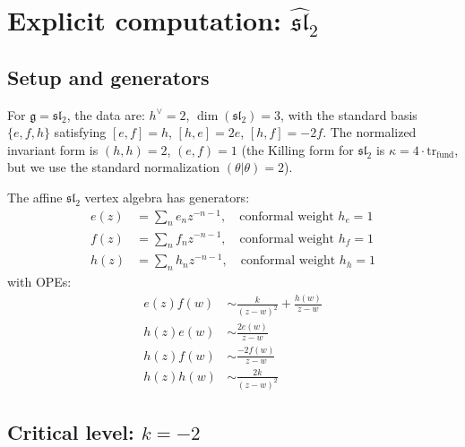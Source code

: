 \section{\texorpdfstring{Explicit computation: $\widehat{\mathfrak{sl}}_2$}{Explicit computation: sl-2}}

\subsection{Setup and generators}

For $\mathfrak{g} = \mathfrak{sl}_2$, the data are: $h^\vee = 2$, $\dim(\mathfrak{sl}_2) = 3$, with the standard basis $\{e, f, h\}$ satisfying $[e,f] = h$, $[h,e] = 2e$, $[h,f] = -2f$.  The normalized invariant form is $(h,h) = 2$, $(e,f) = 1$ (the Killing form for $\mathfrak{sl}_2$ is $\kappa = 4 \cdot \text{tr}_{\text{fund}}$, but we use the standard normalization $(\theta|\theta) = 2$).

\begin{definition}
The affine $\mathfrak{sl}_2$ vertex algebra has generators:
\begin{align}
e(z) &= \sum_n e_n z^{-n-1}, \quad \text{conformal weight } h_e = 1 \\
f(z) &= \sum_n f_n z^{-n-1}, \quad \text{conformal weight } h_f = 1 \\
h(z) &= \sum_n h_n z^{-n-1}, \quad \text{conformal weight } h_h = 1
\end{align}
with OPEs:
\begin{align}
e(z) f(w) &\sim \frac{k}{(z-w)^2} + \frac{h(w)}{z-w} \\
h(z) e(w) &\sim \frac{2e(w)}{z-w} \\
h(z) f(w) &\sim \frac{-2f(w)}{z-w} \\
h(z) h(w) &\sim \frac{2k}{(z-w)^2}
\end{align}
\end{definition}

\subsection{\texorpdfstring{Critical level: $k = -2$}{Critical level: k = -2}}

